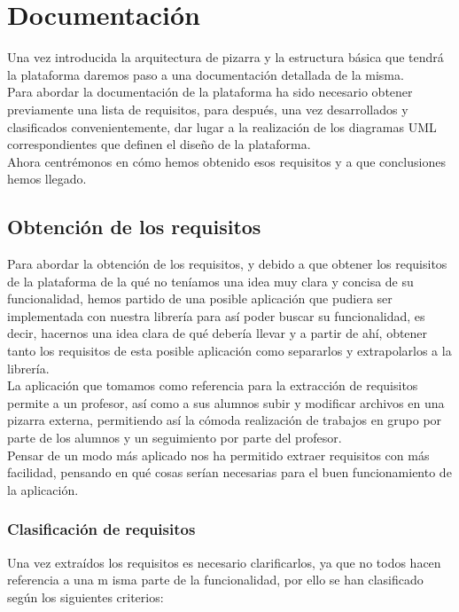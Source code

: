 \chapter{Documentación}
\lettrine[lines=1,slope=4pt,findent=0pt]{U}{}na vez introducida la arquitectura de pizarra y la estructura básica que tendrá la plataforma daremos paso a una documentación detallada de la misma.\\

Para abordar la documentación de la plataforma ha sido necesario obtener previamente una lista de requisitos, para después, una vez desarrollados y clasificados convenientemente, dar lugar a la realización de los diagramas UML correspondientes que definen el diseño de la plataforma.\\

Ahora centrémonos en cómo hemos obtenido esos requisitos y a que conclusiones hemos llegado.

\section{Obtención de los requisitos}
Para abordar la obtención de los requisitos, y debido a que obtener los requisitos de la plataforma de la qué no teníamos una idea muy clara y concisa de su funcionalidad, hemos partido de una posible aplicación que pudiera ser implementada con nuestra librería para así poder buscar su funcionalidad, es decir, hacernos una idea clara de qué debería llevar y a partir de ahí, obtener tanto los requisitos de esta posible aplicación como separarlos y extrapolarlos a la librería.\\

La aplicación que tomamos como referencia para la extracción de requisitos permite a un profesor, así como a sus alumnos subir y modificar archivos en una pizarra externa, permitiendo así la cómoda realización de trabajos en grupo por parte de los alumnos y un seguimiento por parte del profesor.\\

Pensar de un modo más aplicado nos ha permitido extraer requisitos con más facilidad, pensando en qué cosas serían necesarias para el buen funcionamiento de la aplicación.\\

\subsection{Clasificación de requisitos}
Una vez extraídos los requisitos es necesario clarificarlos, ya que no todos hacen referencia a una m isma parte de la funcionalidad, por ello se han clasificado según los siguientes criterios:

